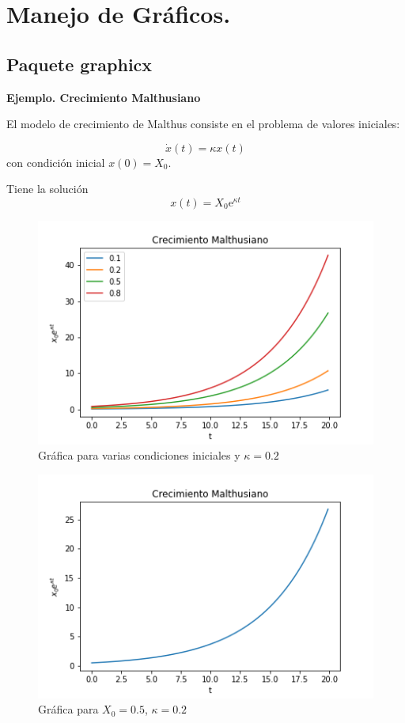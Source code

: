 \chapter{Manejo de Gráficos.}

\section{Paquete {\bf graphicx}}

{\bf Ejemplo. Crecimiento Malthusiano}

El modelo de crecimiento de Malthus consiste en el problema de valores iniciales:

\begin{equation}
    \dot{x}(t)=\kappa x(t)
\end{equation}
con condición inicial $x(0)=X_0$.

 Tiene la solución 
\begin{equation}
    x(t)=X_0\mathrm{e}^{\kappa t}
\end{equation}

\begin{figure}[h!]
    \centering
    \includegraphics[scale=0.5]{malthus2.png}
    \caption{Gráfica para varias condiciones iniciales y $\kappa = 0.2$}
    \label{g2}
\end{figure}

\begin{figure}[h]
    \centering
    \includegraphics[scale=0.5]{malthus.png}
    \caption{Gráfica para $X_0=0.5$, $\kappa = 0.2$}
    \label{g1}
\end{figure}

